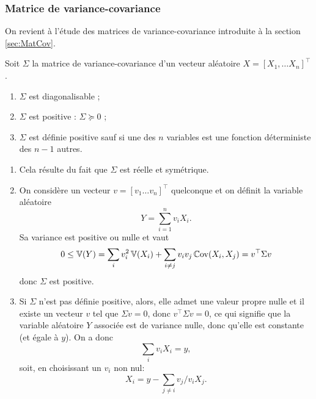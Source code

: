 \subsubsection{Matrice de variance-covariance}

On revient à l'étude des matrices de variance-covariance introduite à la section \ref{sec:MatCov}.

\begin{proposition}
  Soit $\Sigma$ la matrice de variance-covariance d'un vecteur aléatoire $X = [X_1, \dots X_n]^\top$.
  \begin{enumerate}
    \item $\Sigma$ est diagonalisable ;
    \item $\Sigma$ est positive : $\Sigma \succcurlyeq 0$ ;
    \item $\Sigma$ est définie positive sauf si une des $n$ variables est une fonction déterministe des $n-1$ autres.
  \end{enumerate}
\end{proposition}

\proof
\begin{enumerate}
\item Cela résulte du fait que $\Sigma$ est réelle et symétrique.
\item On considère un vecteur $v = [v_1 \dots v_n]^\top$ quelconque et on définit la variable aléatoire 
$$
Y = \sum_{i=1}^n v_i X_i.
$$
Sa variance est positive ou nulle et vaut
$$
0 \leq \operatorname{\mathbb{V}}(Y) 
= \sum_i v_i^2 \operatorname{\mathbb{V}}(X_i) + \sum_{i \neq j} v_i v_j \operatorname{\mathbb{C}ov}(X_i, X_j)
= v^\top \Sigma v
$$
donc $\Sigma$ est positive.
\item Si $\Sigma$  n'est pas définie positive, alors, elle admet une valeur propre nulle et il existe un vecteur $v$ tel que $\Sigma v = 0$, donc $v^\top \Sigma v = 0$, ce qui signifie que la variable aléatoire $Y$ associée est de variance nulle, donc qu'elle est constante (et égale à $y$). On a donc
$$
\sum_i v_i X_i = y,
$$
soit, en choisissant un $v_i$ non nul: 
$$
X_i = y - \sum_{j \neq i} v_j/v_i X_j.
$$
\end{enumerate}
\eproof

